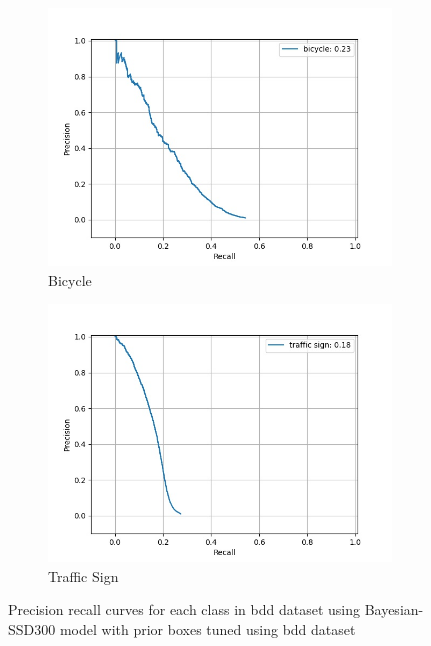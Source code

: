 \begin{figure}[H]
        \begin{center}
    	\begin{subfigure}[t]{0.325\textwidth}
    		\centering
    		\includegraphics[width=\textwidth]{images/bnn_pr/class_bicycle_pr.jpg}
    		\caption{Bicycle}
    	\end{subfigure}
    	\begin{subfigure}[t]{0.325\textwidth}
    		\centering
    		\includegraphics[width=\textwidth]{images/bnn_pr/class_traffic sign_pr.jpg}
    		\caption{Traffic Sign}
    	\end{subfigure}
    \vspace*{-3mm}
    \caption[PR-curves of Bayesian SSD model]{Precision recall curves for each class in \acrshort{bdd} dataset using Bayesian-SSD300 model with prior boxes tuned using \acrshort{bdd} dataset}
    \label{fig:pr_bnn}
    \end{center}
    \end{figure}

